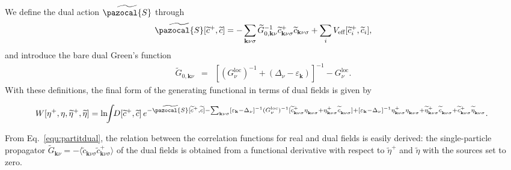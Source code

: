 \documentclass[rmp,aps,reprint,amsmath,amssymb,superscriptaddress,showpacs,nofootinbib]{revtex4-1}
\begin{document}
We define the dual action $\widetilde{\pazocal{S}}$ through
\begin{align}
\label{equ:defdualaction}
 \widetilde{\pazocal{S}}[\widetilde{c}^+,\widetilde{c}]=
 -\sum_{\mathbf{k}\nu\sigma}\widetilde{G}_{0,\mathbf{k}\nu}^{-1}\widetilde{c}^+_{\mathbf{k}\nu\sigma}
 \widetilde{c}_{\mathbf{k}\nu\sigma}+\sum_iV_{\text{eff}}[\widetilde{c}^+_i,\widetilde{c}_i],
\end{align}
and introduce the bare dual Green's function
\begin{eqnarray}
\label{equ:dualgaussfinal}
  \widetilde{G}_{0,\mathbf{k}\nu}&=& \left[(G^\text{loc}_\nu)^{-1} + (\Delta_{\nu}-\varepsilon_{\mathbf{k}})\right]^{-1} - G^\text{loc}_\nu.
\end{eqnarray}
With these definitions, the final form of the generating functional in terms of dual fields is given by
\begin{widetext}
\begin{equation}
\label{equ:partitdual}
  \!\! W[\eta^+,\eta,\widetilde{\eta}^+,\widetilde{\eta}]=\ln\!\!\int\! \!D[\widetilde{c}^+,\widetilde{c}]\,e^{- \widetilde{\pazocal{S}}[\widetilde{c}^+,\widetilde{c}]-\sum_{\mathbf{k}\nu\sigma}[\varepsilon_{\mathbf{k}}-\Delta_{\nu}]^{-1}(G^\text{loc}_\nu)^{-1}[\widetilde{c}^+_{\mathbf{k}\nu\sigma}\eta^{\phantom +}_{\mathbf{k}\nu\sigma}+\eta^+_{\mathbf{k}\nu\sigma}\widetilde{c}^{\phantom +}_{\mathbf{k}\nu\sigma}]+[\varepsilon_{\mathbf{k}}-\Delta_{\nu}]^{-1}\eta^+_{\mathbf{k}\nu\sigma}\eta^{\phantom +}_{\mathbf{k}\nu\sigma} +\widetilde{\eta}^+_{\mathbf{k}\nu\sigma}\widetilde{c}^{\phantom +}_{\mathbf{k}\nu\sigma}+\widetilde{c}^+_{\mathbf{k}\nu\sigma}\widetilde{\eta}^{\phantom +}_{\mathbf{k}\nu\sigma}}.
\end{equation}
\end{widetext}
From Eq.~\eqref{equ:partitdual}, the relation between the correlation functions for real and dual fields is easily derived: the single-particle propagator $ \widetilde{G}_{\mathbf{k}\nu}=-\langle\widetilde{c}^{\phantom +}_{\mathbf{k}\nu\sigma}\widetilde{c}^+_{\mathbf{k}\nu\sigma}\rangle$ of the dual fields is obtained from a functional derivative with respect to $\widetilde{\eta}^+$ and $\widetilde{\eta}$ with the sources set to zero.
\end{document}
